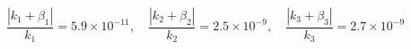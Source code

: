 $$
\frac{|k_1+\beta_1|}{k_1} = 5.9\times10^{-11},\quad \frac{|k_2+\beta_2|}{k_2} = 2.5\times10^{-9},\quad \frac{|k_3+\beta_3|}{k_3} = 2.7\times10^{-9}
$$
